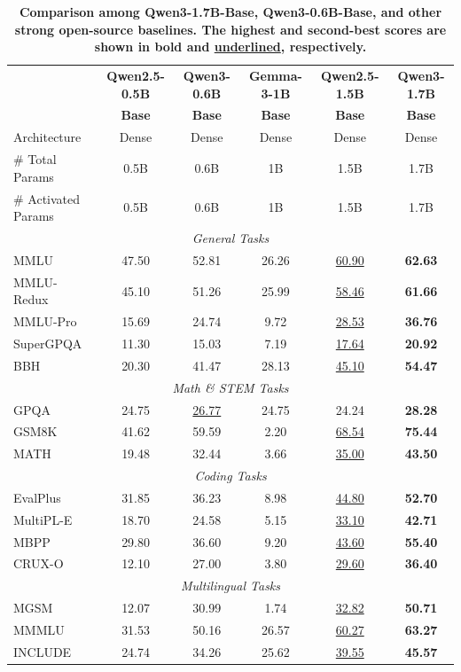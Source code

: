 \documentclass[dvipsnames]{article}
\begin{document}
\begin{table}[tbp]
\centering
\caption{\textbf{Comparison among Qwen3-1.7B-Base, Qwen3-0.6B-Base, and other strong open-source baselines. The highest and second-best scores are shown in \textbf{bold} and \underline{underlined}, respectively.}}
\label{tab:base-1B}
\small 
\begin{tabular}{@{}lccccc@{}}
\toprule
 & \textbf{Qwen2.5-0.5B} & \textbf{Qwen3-0.6B} & \textbf{Gemma-3-1B} & \textbf{Qwen2.5-1.5B} & \textbf{Qwen3-1.7B} \\
 & \textbf{Base} & \textbf{Base} & \textbf{Base} & \textbf{Base} & \textbf{Base} \\
\midrule
Architecture & Dense & Dense & Dense & Dense & Dense\\
\# Total Params & 0.5B & 0.6B & 1B & 1.5B & 1.7B \\
\# Activated Params & 0.5B & 0.6B & 1B & 1.5B & 1.7B \\
\midrule
\multicolumn{6}{c}{\textit{General Tasks}} \\
\midrule
MMLU & 47.50 & 52.81 & 26.26 & \underline{60.90} & \textbf{62.63} \\
MMLU-Redux & 45.10 & 51.26 & 25.99 & \underline{58.46} & \textbf{61.66} \\
MMLU-Pro & 15.69 & 24.74 & 9.72 & \underline{28.53} & \textbf{36.76} \\
SuperGPQA & 11.30 & 15.03 & 7.19 & \underline{17.64} & \textbf{20.92} \\
BBH & 20.30 & 41.47 & 28.13 & \underline{45.10} & \textbf{54.47} \\
\midrule
\multicolumn{6}{c}{\textit{Math \& STEM Tasks}} \\
\midrule
GPQA & 24.75 & \underline{26.77} & 24.75 & 24.24 & \textbf{28.28} \\
GSM8K & 41.62 & 59.59 & 2.20 & \underline{68.54} & \textbf{75.44} \\
MATH & 19.48 & 32.44 & 3.66 & \underline{35.00} & \textbf{43.50} \\
\midrule
\multicolumn{6}{c}{\textit{Coding Tasks}} \\
\midrule
EvalPlus & 31.85 & 36.23 & 8.98 & \underline{44.80} & \textbf{52.70} \\
MultiPL-E & 18.70 & 24.58 & 5.15 & \underline{33.10} & \textbf{42.71} \\
MBPP & 29.80 & 36.60 & 9.20 & \underline{43.60} & \textbf{55.40} \\
CRUX-O & 12.10 & 27.00 & 3.80 & \underline{29.60} & \textbf{36.40} \\
\midrule
\multicolumn{6}{c}{\textit{Multilingual Tasks}} \\
\midrule
MGSM & 12.07 & 30.99 & 1.74 & \underline{32.82} & \textbf{50.71} \\
MMMLU & 31.53 & 50.16 & 26.57 & \underline{60.27} & \textbf{63.27} \\
INCLUDE & 24.74 & 34.26 & 25.62 & \underline{39.55} & \textbf{45.57} \\
\bottomrule
\end{tabular}
\end{table}
\end{document}
